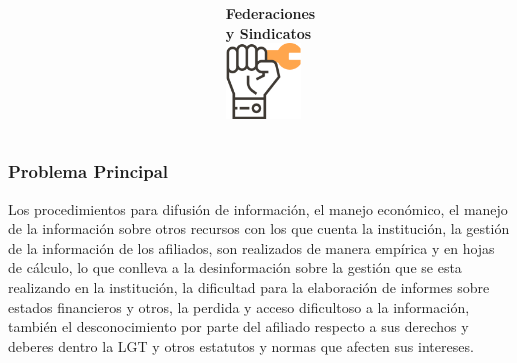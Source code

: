 \documentclass[xcolor=dvipsnames]{beamer}
\begin{document}
\begin{frame}
\begin{columns}
\begin{column}{0.5\textwidth}
      \end{column}
      \begin{column}{0.5\textwidth}
        \centering\textbf{\textcolor{color3}{Federaciones\\ y Sindicatos}\vspace{3mm}}
        \\
        \includegraphics[width=20mm]{005-union.pdf}
      \end{column}
    \end{columns}
\end{frame}

\begin{frame}
    \frametitle{Problema Principal}
    \large\centering Los procedimientos para difusión de información, el manejo económico, el manejo de la información sobre otros recursos con los que cuenta la institución, la gestión de la información de los afiliados, son realizados de manera empírica y en hojas de cálculo, lo que conlleva a la desinformación sobre la gestión que se esta realizando en la institución, la dificultad para la elaboración de informes sobre estados financieros y otros, la perdida y acceso dificultoso a la información, también el desconocimiento por parte del afiliado respecto a sus derechos y deberes dentro la LGT y otros estatutos y normas que afecten sus intereses.
\end{frame}
\end{document}
